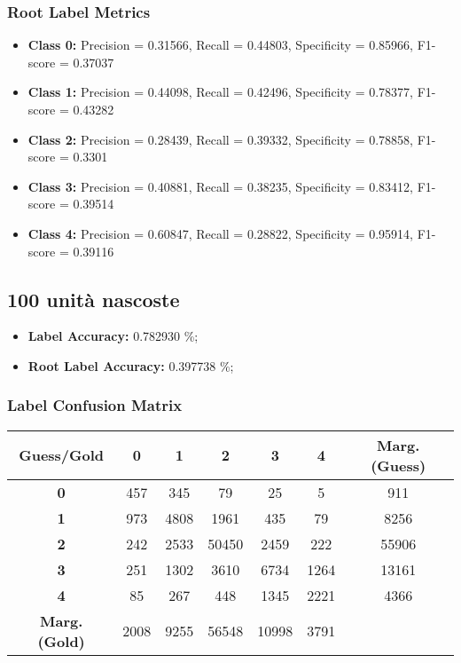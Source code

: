 \subsubsection{Root Label Metrics}
\begin{itemize}
	\item \textbf{Class 0:} Precision = 0.31566, Recall = 0.44803, Specificity = 0.85966, F1-score = 0.37037
	\item \textbf{Class 1:} Precision = 0.44098, Recall = 0.42496, Specificity = 0.78377, F1-score = 0.43282
	\item \textbf{Class 2:} Precision = 0.28439, Recall = 0.39332, Specificity = 0.78858, F1-score = 0.3301
	\item \textbf{Class 3:} Precision = 0.40881, Recall = 0.38235, Specificity = 0.83412, F1-score = 0.39514
	\item \textbf{Class 4:} Precision = 0.60847, Recall = 0.28822, Specificity = 0.95914, F1-score = 0.39116
\end{itemize}

\subsection{100 unità nascoste}

\begin{itemize}
	\item \textbf{Label Accuracy:} 0.782930 \%;
	\item \textbf{Root Label Accuracy:} 0.397738 \%;
\end{itemize}

\subsubsection{Label Confusion Matrix}
\begin{table}[h]
	\centering
	\begin{tabular}{c|ccccc|c}
		\textbf{Guess/Gold}   & \textbf{0} & \textbf{1} & \textbf{2} & \textbf{3} & \textbf{4} & \textbf{Marg. (Guess)} \\
		\hline
		\textbf{0}            & 457        & 345        & 79         & 25         & 5          & 911                    \\
		\textbf{1}            & 973        & 4808       & 1961       & 435        & 79         & 8256                   \\
		\textbf{2}            & 242        & 2533       & 50450      & 2459       & 222        & 55906                  \\
		\textbf{3}            & 251        & 1302       & 3610       & 6734       & 1264       & 13161                  \\
		\textbf{4}            & 85         & 267        & 448        & 1345       & 2221       & 4366                   \\
		\hline
		\textbf{Marg. (Gold)} & 2008       & 9255       & 56548      & 10998      & 3791       &                        \\
	\end{tabular}
\end{table}

